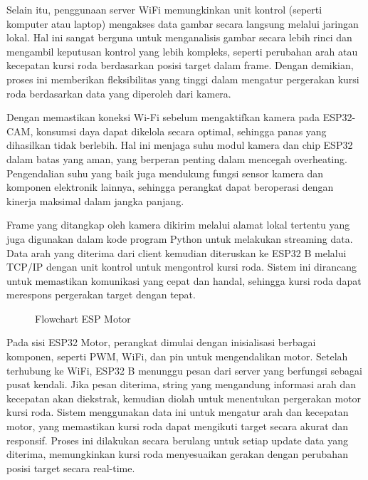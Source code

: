 Selain itu, penggunaan server WiFi memungkinkan unit kontrol (seperti komputer atau laptop) mengakses data gambar secara langsung melalui jaringan lokal. Hal ini sangat berguna untuk menganalisis gambar secara lebih rinci dan mengambil keputusan kontrol yang lebih kompleks, seperti perubahan arah atau kecepatan kursi roda berdasarkan posisi target dalam frame. Dengan demikian, proses ini memberikan fleksibilitas yang tinggi dalam mengatur pergerakan kursi roda berdasarkan data yang diperoleh dari kamera.

Dengan memastikan koneksi Wi-Fi sebelum mengaktifkan kamera pada ESP32-CAM, konsumsi daya dapat dikelola secara optimal, sehingga panas yang dihasilkan tidak berlebih. Hal ini menjaga suhu modul kamera dan chip ESP32 dalam batas yang aman, yang berperan penting dalam mencegah overheating. Pengendalian suhu yang baik juga mendukung fungsi sensor kamera dan komponen elektronik lainnya, sehingga perangkat dapat beroperasi dengan kinerja maksimal dalam jangka panjang.

Frame yang ditangkap oleh kamera dikirim melalui alamat lokal tertentu yang juga digunakan dalam kode program Python untuk melakukan streaming data. Data arah yang diterima dari client kemudian diteruskan ke ESP32 B melalui TCP/IP dengan unit kontrol untuk mengontrol kursi roda. Sistem ini dirancang untuk memastikan komunikasi yang cepat dan handal, sehingga kursi roda dapat merespons pergerakan target dengan tepat.

\begin{figure}[H]
  \centering
  \resizebox{1\linewidth}{!}{
    
  }
  \caption{Flowchart ESP Motor}
\end{figure}

Pada sisi ESP32 Motor, perangkat dimulai dengan inisialisasi berbagai komponen, seperti PWM, WiFi, dan pin untuk mengendalikan motor. Setelah terhubung ke WiFi, ESP32 B menunggu pesan dari server yang berfungsi sebagai pusat kendali. Jika pesan diterima, string yang mengandung informasi arah dan kecepatan akan diekstrak, kemudian diolah untuk menentukan pergerakan motor kursi roda. Sistem menggunakan data ini untuk mengatur arah dan kecepatan motor, yang memastikan kursi roda dapat mengikuti target secara akurat dan responsif. Proses ini dilakukan secara berulang untuk setiap update data yang diterima, memungkinkan kursi roda menyesuaikan gerakan dengan perubahan posisi target secara real-time.

